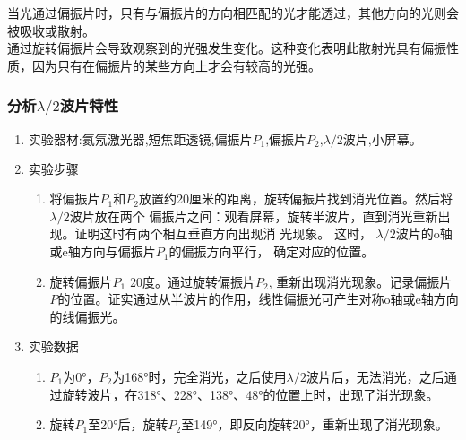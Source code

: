 \documentclass[dvipsnames, svgnames,a4paper,11pt]{article}
\begin{document}
	\indent 当光通过偏振片时，只有与偏振片的方向相匹配的光才能透过，其他方向的光则会被吸收或散射。\\
		\indent 通过旋转偏振片会导致观察到的光强发生变化。这种变化表明此散射光具有偏振性质，因为只有在偏振片的某些方向上才会有较高的光强。
		\clearpage
	\subsubsection{分析$\lambda/2$波片特性}
\begin{enumerate}
	
	\item $\text{实验器材:氦氖激光器,短焦距透镜,偏振片$P_1$,偏振片$P_2$,}\lambda/2\text{波片,小屏幕。}$
	\item 实验步骤


	\begin{enumerate}
		\item  将偏振片$P_1$和$P_2$放置约20厘米的距离，旋转偏振片找到消光位置。然后将$\lambda/2$波片放在两个
		偏振片之间：观看屏幕，旋转半波片，直到消光重新出现。证明这时有两个相互垂直方向出现消
		光现象。 这时， $\lambda/2$波片的o轴或e轴方向与偏振片$P_1$的偏振方向平行， 确定对应的位置。
		\item 旋转偏振片$P_{1}$ 20度。通过旋转偏振片$P_{2}$, 重新出现消光现象。记录偏振片$P$的位置。证实通过从半波片的作用，线性偏振光可产生对称o轴或e轴方向的线偏振光。
	\end{enumerate}
	\item 实验数据
	\begin{enumerate}
		\item $P_1$为0°，$P_2$为168°时，完全消光，之后使用$\lambda/2$波片后，无法消光，之后通过旋转波片，在318°、228°、138°、48°的位置上时，出现了消光现象。
		\item 旋转$P_1$至20°后，旋转$P_2$至149°，即反向旋转20°，重新出现了消光现象。\end{enumerate}\
      



\end{enumerate}
\end{document}
